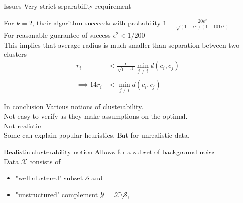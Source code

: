 \documentclass{beamer}
\newcommand{\mc}{\mathcal}
\begin{document}
\begin{frame}{Issues}
	\alert{Very strict} separability requirement
	
	\vspace{0.5cm}For $k = 2$, their algorithm succeeds with probability $1 - \frac{20\epsilon^2}{\sqrt{(1-\epsilon^2)(1-101\epsilon^2)}}$ \\

	\vspace{0.5cm}For reasonable guarantee of success $\epsilon^2 < 1/200$\\
	
	\vspace{1cm}This implies that \alert{average radius} is much smaller than separation between two clusters 
	\begin{align*}
		r_i &< \frac{\epsilon}{\sqrt{1-\epsilon^2}} \min_{j \neq i} d(c_i, c_j)\\\\
		\implies 14 r_i &< \min_{j \neq i} d(c_i, c_j) 
	\end{align*}
\end{frame}

\begin{frame}{In conclusion}
Various notions of clusterability.\\
\vspace{1cm}Not easy to verify as they make assumptions on the optimal. \\
\vspace{1cm}Not {\color{blue}realistic}\\
\vspace{1cm}Some can explain popular heuristics. But for unrealistic data. \\

\end{frame}

\begin{frame}{Realistic clusterability notion}
	Allows for a subset of \alert{background noise}\\
	
	\vspace{1.2cm}Data $\mc X$ consists of 
	\begin{itemize}
	\vspace{0.5cm}
	\item "well clustered" subset $\mc S$ and 
	\vspace{0.5cm}
	\item "unstructured" complement $\mc Y= \mc X \setminus \mc S$,
	\end{itemize}
\end{frame}
\end{document}
